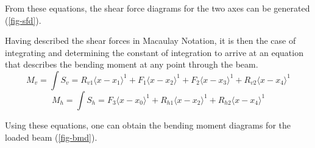 From these equations, the shear force diagrams for the two axes can be generated (\cref{fig-sfd}).

\begin{figure*}[th!]
    
    \hfill
    \hfill
    \hfill
    
    \vspace{2em}
    \caption{Shear force diagrams}
    \label{fig-sfd}
\end{figure*}


Having  described the shear forces in Macaulay Notation, it is then the case of integrating and determining the constant of integration to arrive at an equation that describes the bending moment at any point through the beam.
\begin{equation}
  M_v = \int S_v = R_{v1}\langle x-x_1\rangle^1 + F_{1}\langle x-x_2\rangle^1  + F_{2}\langle x-x_3\rangle^1 + R_{v2}\langle x-x_4\rangle^1
\end{equation}
\begin{equation}
  M_h = \int S_h = F_{3}\langle x-x_0\rangle^1 + R_{h1}\langle x-x_2\rangle^1 + R_{h2}\langle x-x_4\rangle^1
\end{equation}

Using these equations, one can obtain the bending moment diagrams for the loaded beam (\cref{fig-bmd}).

\begin{figure*}[th!]

    \hfill
    \hfill
    \hfill
    
    \vspace{2em}
    \caption{Bending Moment Diagrams}\label{fig-bmd}
\end{figure*}
